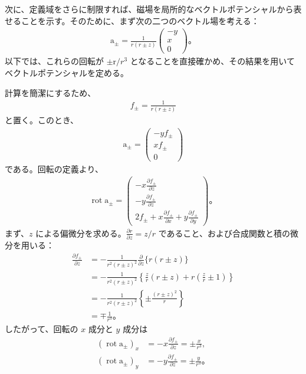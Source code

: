 \documentclass[platex,dvipdfmx,a4paper]{jsarticle}
\newcommand{\hb}[2]{\frac{\partial #1}{\partial #2}}
\newcommand{\vect}[1]{\boldsymbol{\mathrm{#1}}}
\begin{document}
次に、定義域をさらに制限すれば、磁場を局所的なベクトルポテンシャルから表せることを示す。そのために、まず次の二つのベクトル場を考える：
\begin{align*}
  \vect{a}_\pm
  =\frac{1}{r(r\pm z)}
  \begin{pmatrix}
    -y\\
    x\\
    0
  \end{pmatrix}。
\end{align*}
以下では、これらの回転が \(\pm\vect{r}/r^3\) となることを直接確かめ、その結果を用いてベクトルポテンシャルを定める。

計算を簡潔にするため、
\begin{align*}
  f_\pm=\frac{1}{r(r\pm z)}
\end{align*}
と置く。このとき、
\begin{align*}
  \vect{a}_\pm
  =
  \begin{pmatrix}
    -yf_\pm\\
    xf_\pm\\
    0
  \end{pmatrix}
\end{align*}
である。回転の定義より、
\begin{align*}
  \operatorname{rot}\vect{a}_\pm
  =
  \begin{pmatrix}
    \displaystyle -x\hb{f_\pm}{z}\\[4pt]
    \displaystyle -y\hb{f_\pm}{z}\\[4pt]
    \displaystyle 2f_\pm+x\hb{f_\pm}{x}+y\hb{f_\pm}{y}
  \end{pmatrix}。
\end{align*}
まず、\(z\) による偏微分を求める。\(\hb{r}{z}=z/r\) であること、および合成関数と積の微分を用いる：
\begin{align*}
  \hb{f_\pm}{z}
  &=-\frac{1}{r^2(r\pm z)^2}\hb{}{z}\{r(r\pm z)\}\\
  &=-\frac{1}{r^2(r\pm z)^2}
  \left\{\frac{z}{r}(r\pm z)+r\left(\frac{z}{r}\pm1\right)\right\}\\
  &=-\frac{1}{r^2(r\pm z)^2}
  \left\{\pm\frac{(r\pm z)^2}{r}\right\}\\
  &=\mp\frac{1}{r^3}。
\end{align*}
したがって、回転の \(x\) 成分と \(y\) 成分は
\begin{align*}
  (\operatorname{rot}\vect{a}_\pm)_x
  &=-x\hb{f_\pm}{z}
  =\pm\frac{x}{r^3},\\
  (\operatorname{rot}\vect{a}_\pm)_y
  &=-y\hb{f_\pm}{z}
  =\pm\frac{y}{r^3}。
\end{align*}
\end{document}
